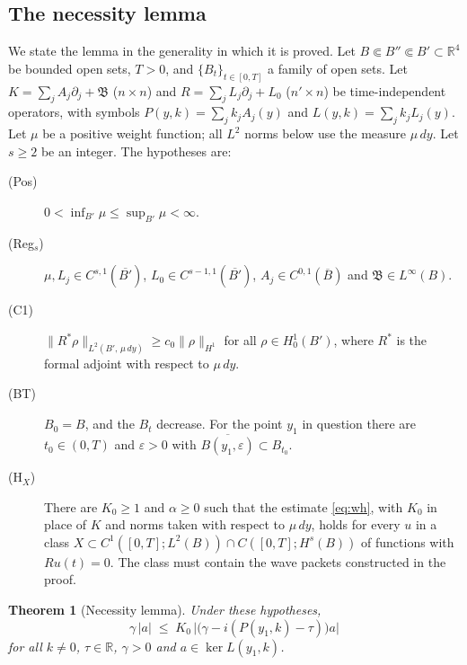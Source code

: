 \documentclass[11pt]{article}
\theoremstyle{plain}
\newtheorem{theorem}{Theorem}[section]
\theoremstyle{definition}
\theoremstyle{remark}
\newcommand{\R}{\mathbb{R}}
\begin{document}
\subsection{The necessity lemma}\label{sec:r1}

We state the lemma in the generality in which it is proved. Let $B \Subset B'' \Subset B' \subset \R^4$ be bounded open sets, $T > 0$, and $\{B_t\}_{t\in[0,T]}$ a family of open sets. Let $K = \sum_j A_j\partial_j + \mathfrak{B}$ ($n\times n$) and $R = \sum_j L_j\partial_j + L_0$ ($n'\times n$) be time-independent operators, with symbols $P(y,k) = \sum_j k_jA_j(y)$ and $L(y,k) = \sum_j k_jL_j(y)$. Let $\mu$ be a positive weight function; all $L^2$ norms below use the measure $\mu\,dy$. Let $s \ge 2$ be an integer. The hypotheses are:
\begin{description}
  \item[(Pos)] $0 < \inf_{B'}\mu \le \sup_{B'}\mu < \infty$.
  \item[(Reg$_s$)] $\mu, L_j \in C^{s,1}(\overline{B'})$, $L_0 \in C^{s-1,1}(\overline{B'})$, $A_j \in C^{0,1}(\overline B)$ and $\mathfrak B \in L^\infty(B)$.
  \item[(C1)] $\|R^*\rho\|_{L^2(B',\,\mu\,dy)} \ge c_0\|\rho\|_{H^1}$ for all $\rho \in H^1_0(B')$, where $R^*$ is the formal adjoint with respect to $\mu\,dy$.
  \item[(BT)] $B_0 = B$, and the $B_t$ decrease. For the point $y_1$ in question there are $t_0 \in (0,T)$ and $\varepsilon > 0$ with $\overline{B(y_1,\varepsilon)} \subset B_{t_0}$.
  \item[(H$_X$)] There are $K_0 \ge 1$ and $\alpha \ge 0$ such that the estimate \eqref{eq:wh}, with $K_0$ in place of $K$ and norms taken with respect to $\mu\,dy$, holds for every $u$ in a class $X \subset C^1([0,T];L^2(B))\cap C([0,T];H^s(B))$ of functions with $Ru(t) = 0$. The class must contain the wave packets constructed in the proof.
\end{description}

\begin{theorem}[Necessity lemma]\label{lem:necessity}
Under these hypotheses,
\[
  \gamma\,|a| \;\le\; K_0\,\bigl|\bigl(\gamma - i(P(y_1,k) - \tau)\bigr)a\bigr|
\]
for all $k \neq 0$, $\tau \in \R$, $\gamma > 0$ and $a \in \ker L(y_1,k)$.
\end{theorem}
\end{document}
